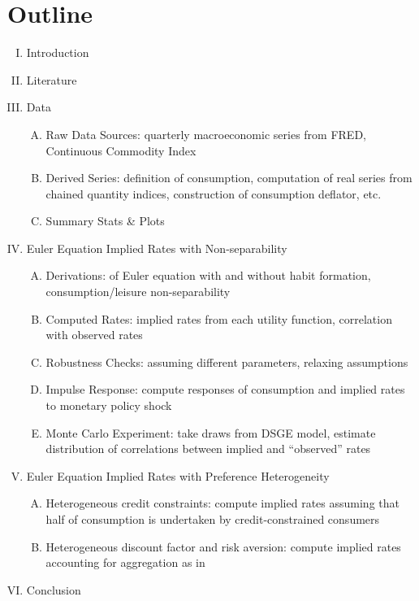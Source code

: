 \documentclass{hw}
\begin{document}
\section{Outline}
\begin{enumerate}[I.]
\item Introduction
\item Literature
\item Data
  \begin{enumerate}[A.]
  \item Raw Data Sources: quarterly macroeconomic series from FRED, Continuous Commodity Index
  \item Derived Series: definition of consumption, computation of real series from chained quantity indices, construction of consumption deflator, etc.
  \item Summary Stats \& Plots
  \end{enumerate}
\item Euler Equation Implied Rates with Non-separability
  \begin{enumerate}[A.]
  \item Derivations: of Euler equation with and without habit formation, consumption/leisure non-separability
  \item Computed Rates: implied rates from each utility function, correlation with observed rates
  \item Robustness Checks: assuming different parameters, relaxing assumptions
  \item Impulse Response: compute responses of consumption and implied rates to monetary policy shock
  \item Monte Carlo Experiment: take draws from \cite{smets07} DSGE model, estimate distribution of correlations between implied and ``observed'' rates
  \end{enumerate}
\item Euler Equation Implied Rates with Preference Heterogeneity
  \begin{enumerate}[A.]
  \item Heterogeneous credit constraints: compute implied rates assuming that half of consumption is undertaken by credit-constrained consumers
  \item Heterogeneous discount factor and risk aversion: compute implied rates accounting for aggregation as in \cite{hara09}
  \end{enumerate}
\item Conclusion
\end{enumerate}



\end{document}

